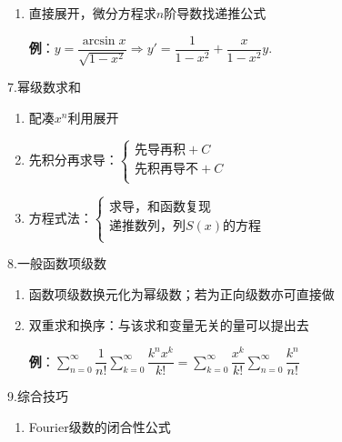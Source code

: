 \documentclass[UTF8]{ctexart}
\numberwithin{equation}{section}
\numberwithin{figure}{section}
\numberwithin{table}{section}
\newcommand\no{\noindent}
\newcommand\dis{\displaystyle}
\newcommand\sumnz{\dis\sum\limits_{n=0}^{\infty}}
\newcommand\sumkz{\dis\sum\limits_{k=0}^{\infty}}
\begin{document}
\begin{spacing}{2}
\begin{enumerate}[itemindent=1.4em, label=(\arabic*)]
\item 直接展开，微分方程求$n$阶导数找递推公式

\textbf{例}：$y=\dfrac{\arcsin x}{\sqrt{1-x^2}}\Longrightarrow
y'=\dfrac{1}{1-x^2}+\dfrac{x}{1-x^2}y.$

\end{enumerate}

\no7.幂级数求和

\begin{enumerate}[itemindent=1.4em, label=(\arabic*)]

\item 配凑$x^n$利用展开

\item 先积分再求导：$\left\{\begin{array}{l}
\text{先导再积}+C\\
\text{先积再导不}+C\\
\end{array}\right.$
                                                                                                                                                 
\item 方程式法：$\left\{\begin{array}{l}
\text{求导，和函数复现}\\
\text{递推数列，列}S(x)\text{的方程}\\
\end{array}\right.$

\end{enumerate}

\no8.一般函数项级数

\begin{enumerate}[itemindent=1.4em, label=(\arabic*)]

\item 函数项级数换元化为幂级数；若为正向级数亦可直接做

\item 双重求和换序：与该求和变量无关的量可以提出去

\textbf{例}：$\sumnz \dfrac{1}{n!}\sumkz\dfrac{k^nx^k}{k!}=
\sumkz\dfrac{x^k}{k!}\sumnz\dfrac{k^n}{n!}$

\end{enumerate}

\no9.综合技巧

\begin{enumerate}[itemindent=1.4em, label=(\arabic*)]

\item Fourier级数的闭合性公式


\end{enumerate}
\end{spacing}
\end{document}

